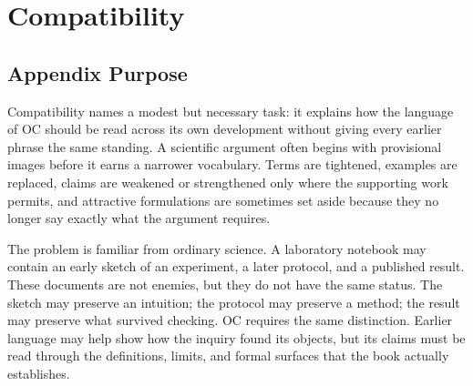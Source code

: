 \documentclass[11pt,a4paper,openany]{book}
\begin{document}
\section{Compatibility}
\subsection{Appendix Purpose}
Compatibility names a modest but necessary task: it explains how the language of OC should be read across its own development without giving every earlier phrase the same standing. A scientific argument often begins with provisional images before it earns a narrower vocabulary. Terms are tightened, examples are replaced, claims are weakened or strengthened only where the supporting work permits, and attractive formulations are sometimes set aside because they no longer say exactly what the argument requires. \cite{prigogine_dissipative,haken_synergetics}\par
The problem is familiar from ordinary science. A laboratory notebook may contain an early sketch of an experiment, a later protocol, and a published result. These documents are not enemies, but they do not have the same status. The sketch may preserve an intuition; the protocol may preserve a method; the result may preserve what survived checking. OC requires the same distinction. Earlier language may help show how the inquiry found its objects, but its claims must be read through the definitions, limits, and formal surfaces that the book actually establishes.\par
\end{document}
